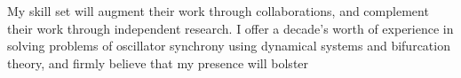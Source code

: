 My skill set will augment their work through collaborations, and complement their work through independent research. I offer a decade's worth of experience in solving problems of oscillator synchrony using dynamical systems and bifurcation theory, and firmly believe that my presence will bolster